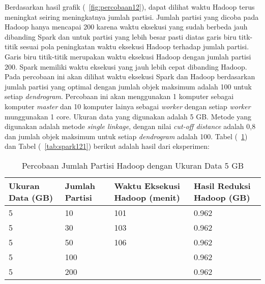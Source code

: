 Berdasarkan hasil grafik (~\ref{fig:percobaan12}), dapat dilihat waktu Hadoop terus meningkat seiring meningkatnya jumlah partisi. Jumlah partisi yang dicoba pada Hadoop hanya mencapai 200 karena waktu eksekusi yang sudah berbeda jauh dibanding Spark dan untuk partisi yang lebih besar pasti diatas garis biru titk-titik sesuai pola peningkatan waktu eksekusi Hadoop terhadap jumlah partisi. Garis biru titik-titik merupakan waktu eksekusi Hadoop dengan jumlah partisi 200. Spark memiliki waktu eksekusi yang jauh lebih cepat dibanding Hadoop. \\















Pada percobaan ini akan dilihat waktu eksekusi Spark dan Hadoop berdasarkan jumlah partisi yang optimal dengan jumlah objek maksimum adalah 100 untuk setiap \textit{dendrogram}. Percobaan ini akan menggunakan 1 komputer sebagai komputer \textit{master} dan 10 komputer lainya sebagai \textit{worker} dengan setiap \textit{worker} munggunakan 1 core. Ukuran data yang digunakan adalah 5 GB. Metode yang digunakan adalah metode \textit{single linkage}, dengan nilai \textit{cut-off distance} adalah 0,8 dan jumlah objek maksimum untuk setiap \textit{dendrogram} adalah 100. Tabel (~\ref{tab:spark111}) dan Tabel (~\ref{tab:spark121}) berikut adalah hasil dari eksperimen:





\begin{table}[H] 
	\centering 
	\caption{Percobaan Jumlah Partisi Hadoop dengan Ukuran Data 5 GB}
	\label{tab:spark111}
	\begin{tabular}{|p{3cm}|p{3cm}|p{4cm}|p{4cm}|}
\hline
Ukuran Data (GB) & Jumlah Partisi &  Waktu Eksekusi Hadoop (menit) & Hasil Reduksi Hadoop (GB)\\
\hline
5 & 10 & 101  & 0.962  \\
\hline
5 & 30 & 103  & 0.962  \\
\hline
5 & 50 & 106  & 0.962   \\
\hline
5 & 100 &   & 0.962   \\
\hline
5 & 200 &   & 0.962   \\
\hline


\hline

	\end{tabular} 
\end{table}






